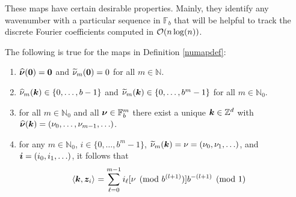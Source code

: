 \documentclass[graybox]{svmult}
\newcommand{\Z}{\mathbb{Z}} %
\newcommand{\N}{\mathbb{N}} %
\newcommand{\F}{\mathbb{F}} %
\newcommand{\bszero}{\boldsymbol{0}} %
\newcommand{\bsz}{\boldsymbol{z}}    %
\begin{document}
These maps have certain desirable properties. Mainly, they identify any wavenumber with a particular sequence in $\F_b$ that will be helpful to track the discrete Fourier coefficients computed in $\mathcal{O}(n\log(n))$.

\begin{lemma} \label{numaplem} The following is true for the maps in Definition \ref{numapdef}:
\begin{enumerate}
\item $\hbsnu(\bszero)=\bszero$ and $\tnu_m(\bszero) = 0$ for all $m \in \N$.
\item $\widehat{\nu}_m(\boldsymbol{k})\in \{0,\dots,b-1\}$ and $\widetilde{\nu}_m(\boldsymbol{k})\in \{0,\dots,b^m-1\}$ for all $m\in\N_0$.
\item for all $m\in \N_0$ and all $\bsnu \in \F_b^{m}$ there exist a unique $\bsk \in \Z^d$ with $\widehat{\boldsymbol{\nu}}(\boldsymbol{k})=(\nu_0, \ldots, \nu_{m-1}, \ldots)$.
\item for any $m \in \N_0$, $i \in \{0, \ldots, b^m-1\}$,  $\widetilde{\nu}_m(\boldsymbol{k})=\nu=(\nu_0, \nu_1, \ldots)$, and $\boldsymbol{i}=(i_0, i_1, \ldots)$, it follows that
\begin{align} \label{nuwisum}
\begin{split}
\ip{\bsk}{\bsz_i} &= \sum_{\ell=0}^{m-1} i_\ell [\nu \pmod  {b^{(l+1)}}]  b^{-(l+1)} \pmod 1
\end{split}
\end{align}

\end{enumerate}
\end{lemma}
\end{document}
